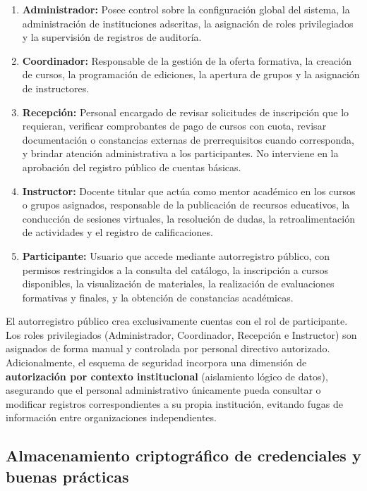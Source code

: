 \begin{enumerate}
    \item \textbf{Administrador:} Posee control sobre la configuración global del sistema, la administración de instituciones adscritas, la asignación de roles privilegiados y la supervisión de registros de auditoría.
    \item \textbf{Coordinador:} Responsable de la gestión de la oferta formativa, la creación de cursos, la programación de ediciones, la apertura de grupos y la asignación de instructores.
    \item \textbf{Recepción:} Personal encargado de revisar solicitudes de inscripción que lo requieran, verificar comprobantes de pago de cursos con cuota, revisar documentación o constancias externas de prerrequisitos cuando corresponda, y brindar atención administrativa a los participantes. No interviene en la aprobación del registro público de cuentas básicas.
    \item \textbf{Instructor:} Docente titular que actúa como mentor académico en los cursos o grupos asignados, responsable de la publicación de recursos educativos, la conducción de sesiones virtuales, la resolución de dudas, la retroalimentación de actividades y el registro de calificaciones.
    \item \textbf{Participante:} Usuario que accede mediante autorregistro público, con permisos restringidos a la consulta del catálogo, la inscripción a cursos disponibles, la visualización de materiales, la realización de evaluaciones formativas y finales, y la obtención de constancias académicas.
\end{enumerate}

El autorregistro público crea exclusivamente cuentas con el rol de participante. Los roles privilegiados (Administrador, Coordinador, Recepción e Instructor) son asignados de forma manual y controlada por personal directivo autorizado. Adicionalmente, el esquema de seguridad incorpora una dimensión de \textbf{autorización por contexto institucional} (aislamiento lógico de datos), asegurando que el personal administrativo únicamente pueda consultar o modificar registros correspondientes a su propia institución, evitando fugas de información entre organizaciones independientes.

\subsection{Almacenamiento criptográfico de credenciales y buenas prácticas}

